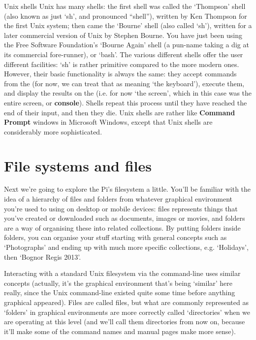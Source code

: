 \begin{diversion}{Unix shells}
Unix has many shells: the first shell was called the `Thompson' shell (also known as just `sh', and pronounced ``shell''), written by Ken Thompson for the first Unix system; then came the `Bourne' shell (also called `sh'), written for a later commercial version of Unix by Stephen Bourne. You have just been using the Free Software Foundation's `Bourne Again' shell (a pun-name taking a dig at its commercial fore-runner), or `bash'. The various different shells offer the user different facilities: `sh' is rather
primitive compared to the more modern ones. However, their basic
functionality is always the same: they accept commands from the
 (for now, we can treat that as meaning `the keyboard'), execute them, and display
the results on the  (i.e. for now `the screen', which in
this case was the entire screen, or \textbf{console}). Shells repeat
this process until they have reached the end of their input, and then
they die. Unix shells are rather like \textbf{Command Prompt} windows in Microsoft
Windows, except that Unix shells are considerably more sophisticated.
\end{diversion}



\section{File systems and files}

Next we're going to explore the Pi's filesystem a little. You'll be familiar with the idea of a hierarchy of files and folders from whatever graphical environment you're used to using on desktop or mobile devices: files represents things that you've created or downloaded such as documents, images or movies, and folders are a way of organising these into related collections. By putting folders inside folders, you can organise your stuff starting with general concepts such as `Photographs' and ending up with much more specific collections, e.g. `Holidays', then `Bognor Regis 2013'.

Interacting with a standard Unix filesystem via the command-line uses similar concepts (actually, it's the graphical environment that's being `similar' here really, since the Unix command-line existed quite some time before anything graphical appeared). Files are called files, but what are commonly represented as `folders' in graphical environments are more correctly called `directories' when we are operating at this level (and we'll call them directories from now on, because it'll make some of the command names and manual pages make more sense).

